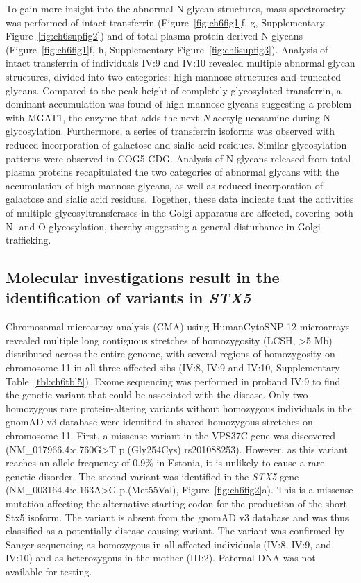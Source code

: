 To gain more insight into the abnormal N-glycan structures, mass spectrometry was performed of intact transferrin (Figure~\ref{fig:ch6fig1}f, g, Supplementary Figure~\ref{fig:ch6supfig2}) and of total plasma protein derived N-glycans (Figure~\ref{fig:ch6fig1}f, h, Supplementary Figure~\ref{fig:ch6supfig3}). Analysis of intact transferrin of individuals IV:9 and IV:10 revealed multiple abnormal glycan structures, divided into two categories: high mannose structures and truncated glycans. Compared to the peak height of completely glycosylated transferrin, a dominant accumulation was found of high-mannose glycans suggesting a problem with MGAT1, the enzyme that adds the next \emph{N}-acetylglucosamine during N-glycosylation. Furthermore, a series of transferrin isoforms was observed with reduced incorporation of galactose and sialic acid residues. Similar glycosylation patterns were observed in COG5-CDG\cite{fung_cog5-cdg_2012,paesold-burda_deficiency_2009,palmigiano_maldi-ms_2017,rymen_cog5-cdg_2012}. Analysis of N-glycans released from total plasma proteins recapitulated the two categories of abnormal glycans with the accumulation of high mannose glycans, as well as reduced incorporation of galactose and sialic acid residues. Together, these data indicate that the activities of multiple glycosyltransferases in the Golgi apparatus are affected, covering both N- and O-glycosylation, thereby suggesting a general disturbance in Golgi trafficking.   

\subsection{Molecular investigations result in the identification of variants in \emph{STX5}}

Chromosomal microarray analysis (CMA) using HumanCytoSNP-12 microarrays revealed multiple long contiguous stretches of homozygosity (LCSH, >5 Mb) distributed across the entire genome, with several regions of homozygosity on chromosome 11 in all three affected sibs (IV:8, IV:9 and IV:10, Supplementary Table~\ref{tbl:ch6tbl5}). Exome sequencing was performed in proband IV:9 to find the genetic variant that could be associated with the disease. Only two homozygous rare protein-altering variants without homozygous individuals in the gnomAD v3 database were identified in shared homozygous stretches on chromosome 11. First, a missense variant in the VPS37C gene was discovered (NM\_017966.4:c.760G>T p.(Gly254Cys) rs201088253). However, as this variant reaches an allele frequency of 0.9\% in Estonia, it is unlikely to cause a rare genetic disorder. The second variant was identified in the \emph{STX5} gene (NM\_003164.4:c.163A>G p.(Met55Val), Figure~\ref{fig:ch6fig2}a). This is a missense mutation affecting the alternative starting codon for the production of the short Stx5 isoform. The variant is absent from the gnomAD v3 database and was thus classified as a potentially disease-causing variant. The variant was confirmed by Sanger sequencing as homozygous in all affected individuals (IV:8, IV:9, and IV:10) and as heterozygous in the mother (III:2). Paternal DNA was not available for testing.


